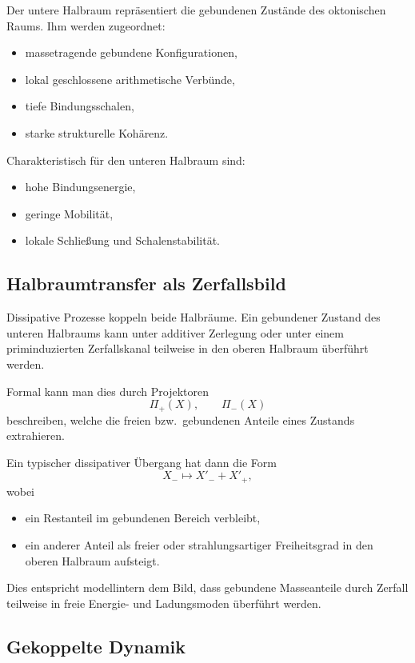 \documentclass[11pt,a4paper]{article}
\theoremstyle{definition}
\begin{document}
Der untere Halbraum repräsentiert die gebundenen Zustände des oktonischen Raums. Ihm werden zugeordnet:
\begin{itemize}
	\item massetragende gebundene Konfigurationen,
	\item lokal geschlossene arithmetische Verbünde,
	\item tiefe Bindungsschalen,
	\item starke strukturelle Kohärenz.
\end{itemize}

Charakteristisch für den unteren Halbraum sind:
\begin{itemize}
	\item hohe Bindungsenergie,
	\item geringe Mobilität,
	\item lokale Schließung und Schalenstabilität.
\end{itemize}

\subsection{Halbraumtransfer als Zerfallsbild}

Dissipative Prozesse koppeln beide Halbräume. Ein gebundener Zustand des unteren Halbraums kann unter additiver Zerlegung oder unter einem priminduzierten Zerfallskanal teilweise in den oberen Halbraum überführt werden.

Formal kann man dies durch Projektoren
\[
\Pi_+(X),\qquad \Pi_-(X)
\]
beschreiben, welche die freien bzw.\ gebundenen Anteile eines Zustands extrahieren.

Ein typischer dissipativer Übergang hat dann die Form
\[
X_- \longmapsto X'_- + X'_+,
\]
wobei
\begin{itemize}
	\item ein Restanteil im gebundenen Bereich verbleibt,
	\item ein anderer Anteil als freier oder strahlungsartiger Freiheitsgrad in den oberen Halbraum aufsteigt.
\end{itemize}

Dies entspricht modellintern dem Bild, dass gebundene Masseanteile durch Zerfall teilweise in freie Energie- und Ladungsmoden überführt werden.

\subsection{Gekoppelte Dynamik}
\end{document}
